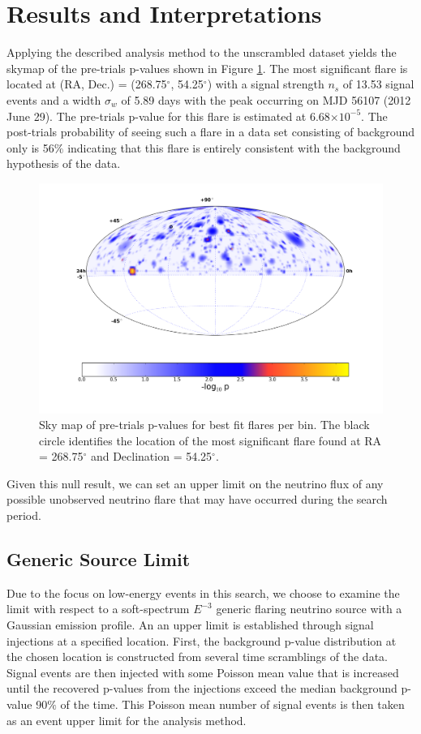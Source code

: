 \documentclass[manuscript]{aastex}
\begin{document}
\section{Results and Interpretations}
Applying the described analysis method to the unscrambled dataset yields the skymap of the pre-trials p-values shown in Figure \ref{fig:RealSkyMap}. The most significant flare is located at (RA, Dec.) = (268.75$^{\circ}$, 54.25$^{\circ}$) with a signal strength $n_s$ of 13.53 signal events and a width $\sigma_w$ of 5.89 days with the peak occurring on MJD 56107 (2012 June 29). The pre-trials p-value for this flare is estimated at 6.68$\times 10^{-5}$. The post-trials probability of seeing such a flare in a data set consisting of background only is 56$\%$ indicating that this flare is entirely consistent with the background hypothesis of the data.
\begin{figure}[ht]
  \begin{center}
    \includegraphics[width=1.0\textwidth,keepaspectratio]{plots/RealResultSkyMap.png}
  \end{center}
  \caption[Results Sky Map]{Sky map of pre-trials p-values for best fit flares per bin. The black circle identifies the location of the most significant flare found at RA = 268.75$^\circ$ and Declination = 54.25$^\circ$.}
  \label{fig:RealSkyMap}
\end{figure}
Given this null result, we can set an upper limit on the neutrino flux of any possible unobserved neutrino flare that may have occurred during the search period. 
\subsection{Generic Source Limit}
Due to the focus on low-energy events in this search, we choose to examine the limit with respect to a soft-spectrum $E^{-3}$ generic flaring neutrino source with a Gaussian emission profile. An an upper limit is established through signal injections at a specified location. First, the background p-value distribution at the chosen location is constructed from several time scramblings of the data. Signal events are then injected with some Poisson mean value that is increased until the recovered p-values from the injections exceed the median background p-value 90$\%$ of the time. This Poisson mean number of signal events is then taken as an event upper limit for the analysis method.
\end{document}
